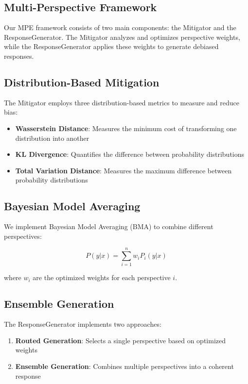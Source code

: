 \subsection{Multi-Perspective Framework}
Our MPE framework consists of two main components: the Mitigator and the ResponseGenerator. The Mitigator analyzes and optimizes perspective weights, while the ResponseGenerator applies these weights to generate debiased responses.

\subsection{Distribution-Based Mitigation}
The Mitigator employs three distribution-based metrics to measure and reduce bias:

\begin{itemize}
    \item \textbf{Wasserstein Distance}: Measures the minimum cost of transforming one distribution into another
    \item \textbf{KL Divergence}: Quantifies the difference between probability distributions
    \item \textbf{Total Variation Distance}: Measures the maximum difference between probability distributions
\end{itemize}

\subsection{Bayesian Model Averaging}
We implement Bayesian Model Averaging (BMA) to combine different perspectives:

\begin{equation}
    P(y|x) = \sum_{i=1}^{n} w_i P_i(y|x)
\end{equation}

where $w_i$ are the optimized weights for each perspective $i$.

\subsection{Ensemble Generation}
The ResponseGenerator implements two approaches:

\begin{enumerate}
    \item \textbf{Routed Generation}: Selects a single perspective based on optimized weights
    \item \textbf{Ensemble Generation}: Combines multiple perspectives into a coherent response
\end{enumerate}


